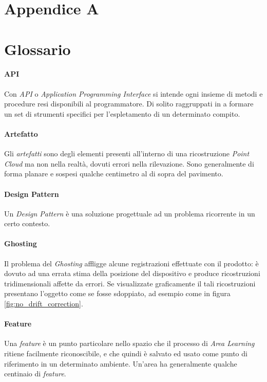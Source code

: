 
\chapter{Appendice A}
\chapter{Glossario}\label{appendix:Glossario}

\subsubsection{API}
Con \emph{API} o \emph{Application Programming Interface} si intende ogni insieme di metodi e procedure resi disponibili al programmatore. Di solito raggruppati in a formare un set di strumenti specifici per l'espletamento di un determinato compito.

\subsubsection{Artefatto}
Gli \emph{artefatti} sono degli elementi presenti all'interno di una ricostruzione \emph{Point Cloud} ma non nella realtà, dovuti errori nella rilevazione. Sono generalmente di forma planare e sospesi qualche centimetro al di sopra del pavimento.

\subsubsection{Design Pattern}
Un \emph{Design Pattern} è una soluzione progettuale ad un problema ricorrente in un certo contesto.

\subsubsection{Ghosting}
Il problema del \emph{Ghosting} affligge alcune registrazioni effettuate con il prodotto: è dovuto ad una errata stima della posizione del dispositivo e produce ricostruzioni tridimensionali affette da errori. Se visualizzate graficamente il tali ricostruzioni presentano l'oggetto come se fosse sdoppiato, ad esempio come in figura \ref{fig:no_drift_correction}.

\subsubsection{Feature}
Una \emph{feature} è un punto particolare nello spazio che il processo di \emph{Area Learning} ritiene facilmente riconoscibile, e che quindi è salvato ed usato come punto di riferimento in un determinato ambiente. Un'area ha generalmente qualche centinaio di \emph{feature}.

